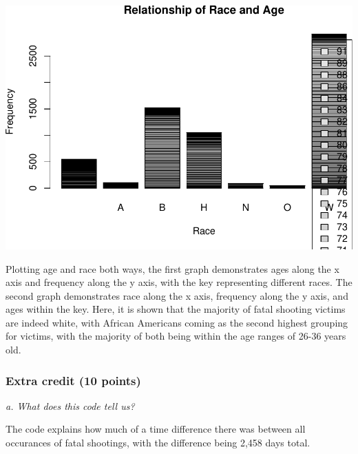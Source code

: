 \documentclass[
]{article}
\newenvironment{Shaded}{\begin{snugshade}}{\end{snugshade}}
\newcommand{\DecValTok}[1]{\textcolor[rgb]{0.00,0.00,0.81}{#1}}
\newcommand{\FunctionTok}[1]{\textcolor[rgb]{0.00,0.00,0.00}{#1}}
\newcommand{\NormalTok}[1]{#1}
\newcommand{\OtherTok}[1]{\textcolor[rgb]{0.56,0.35,0.01}{#1}}
\newcommand{\SpecialCharTok}[1]{\textcolor[rgb]{0.00,0.00,0.00}{#1}}
\begin{document}
\includegraphics{Journal_files/figure-latex/unnamed-chunk-31-2.pdf}

Plotting age and race both ways, the first graph demonstrates ages along
the x axis and frequency along the y axis, with the key representing
different races. The second graph demonstrates race along the x axis,
frequency along the y axis, and ages within the key. Here, it is shown
that the majority of fatal shooting victims are indeed white, with
African Americans coming as the second highest grouping for victims,
with the majority of both being within the age ranges of 26-36 years
old.

\hypertarget{extra-credit-10-points}{%
\subsubsection{Extra credit (10 points)}\label{extra-credit-10-points}}

\emph{a. What does this code tell us?}

\begin{Shaded}
\end{Shaded}

The code explains how much of a time difference there was between all
occurances of fatal shootings, with the difference being 2,458 days
total.
\end{document}
